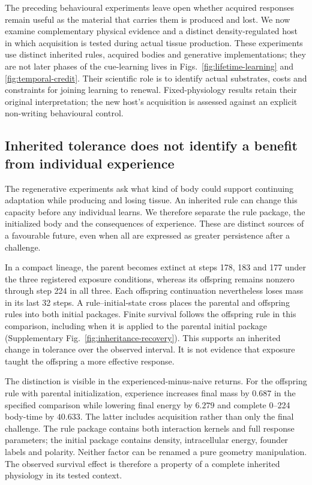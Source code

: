 The preceding behavioural experiments leave open whether acquired responses remain useful as the material that carries them is produced and lost. We now examine complementary physical evidence and a distinct density-regulated host in which acquisition is tested during actual tissue production. These experiments use distinct inherited rules, acquired bodies and generative implementations; they are not later phases of the cue-learning lives in Figs.~\ref{fig:lifetime-learning} and \ref{fig:temporal-credit}. Their scientific role is to identify actual substrates, costs and constraints for joining learning to renewal. Fixed-physiology results retain their original interpretation; the new host's acquisition is assessed against an explicit non-writing behavioural control.

\subsection*{Inherited tolerance does not identify a benefit from individual experience}

The regenerative experiments ask what kind of body could support continuing adaptation while producing and losing tissue. An inherited rule can change this capacity before any individual learns. We therefore separate the rule package, the initialized body and the consequences of experience. These are distinct sources of a favourable future, even when all are expressed as greater persistence after a challenge.

In a compact lineage, the parent becomes extinct at steps 178, 183 and 177 under the three registered exposure conditions, whereas its offspring remains nonzero through step 224 in all three. Each offspring continuation nevertheless loses mass in its last 32 steps. A rule--initial-state cross places the parental and offspring rules into both initial packages. Finite survival follows the offspring rule in this comparison, including when it is applied to the parental initial package (Supplementary Fig.~\ref{fig:inheritance-recovery}). This supports an inherited change in tolerance over the observed interval. It is not evidence that exposure taught the offspring a more effective response.

The distinction is visible in the experienced-minus-naive returns. For the offspring rule with parental initialization, experience increases final mass by $0.687$ in the specified comparison while lowering final energy by $6.279$ and complete 0--224 body-time by $40.633$. The latter includes acquisition rather than only the final challenge. The rule package contains both interaction kernels and full response parameters; the initial package contains density, intracellular energy, founder labels and polarity. Neither factor can be renamed a pure geometry manipulation. The observed survival effect is therefore a property of a complete inherited physiology in its tested context.

